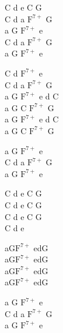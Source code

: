 \begin{chord}
    C d e C G\\
    C d a $\mathrm{F^{7+}}$ G\\
    a G $\mathrm{F^{7+}}$ e\\
    C d a $\mathrm{F^{7+}}$ G\\
    a G $\mathrm{F^{7+}}$ e

    C d $\mathrm{F^{7+}}$ e\\
    C d a $\mathrm{F^{7+}}$ G\\
    a G $\mathrm{F^{7+}}$ e d C\\
    a G C $\mathrm{F^{7+}}$ G\\
    a G $\mathrm{F^{7+}}$ e d C\\
    a G C $\mathrm{F^{7+}}$ G

    a G $\mathrm{F^{7+}}$ e\\
    C d a $\mathrm{F^{7+}}$ G\\
    a G $\mathrm{F^{7+}}$ e

    C d e C G\\
    C d e C G\\
    C d e C G\\
    C d e

    aG$\mathrm{F^{7+}}$ edG\\
    aG$\mathrm{F^{7+}}$ edG\\
    aG$\mathrm{F^{7+}}$ edG\\
    aG$\mathrm{F^{7+}}$ edG

    a G $\mathrm{F^{7+}}$ e\\
    C d a $\mathrm{F^{7+}}$ G\\
    a G $\mathrm{F^{7+}}$ e
\end{chord}
